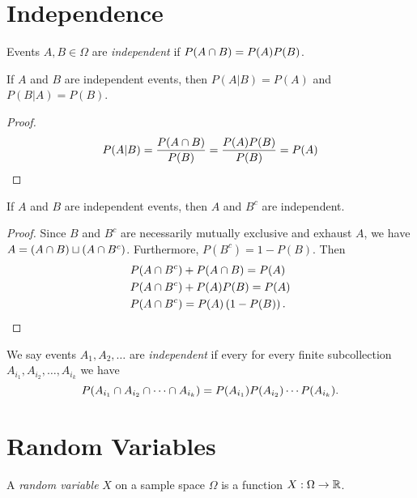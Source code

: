 \section{Independence}

\begin{defn}
    Events $A, B \in \Omega$ are \emph{independent} if $P(A \cap B) = P(A)P(B)$.
\end{defn}

\begin{prop}
    If $A$ and $B$ are independent events, then $P(A | B) = P(A)$ and $P(B | A) = P(B)$.
\end{prop}

\begin{proof}
    \[P(A | B) = \frac{P(A \cap B)}{P(B)} = \frac{P(A)P(B)}{P(B)} = P(A)\]
\end{proof}

\begin{prop}
    If $A$ and $B$ are independent events, then $A$ and $B^{c}$ are independent.
\end{prop}

\begin{proof} Since $B$ and $B^{c}$ are necessarily mutually exclusive and exhaust $A$, we have $A = (A \cap B) \sqcup (A \cap B^{c})$. Furthermore, $P(B^{c}) = 1- P(B)$. Then
    \begin{align}
        P(A \cap B^{c}) &+ P(A \cap B) = P(A) \\
        P(A \cap B^{c}) &+ P(A)P(B) = P(A) \\
        P(A \cap B^{c}) &= P(A)\left(1 - P(B)\right).
    \end{align}
\end{proof}

\begin{defn}
    We say events $A_1, A_2, \ldots$ are \emph{independent} if every for every finite subcollection $A_{i_1}, A_{i_2}, \ldots, A_{i_k}$ we have
    \[P(A_{i_1} \cap A_{i_2} \cap \cdots \cap A_{i_k}) = P(A_{i_1})P(A_{i_2})\cdots P(A_{i_k}).\]
\end{defn}

\section{Random Variables}

\begin{defn}
    A \emph{random variable} $X$ on a sample space $\Omega$ is a function $X: \Omega \to \mathbb{R}$.
\end{defn}

